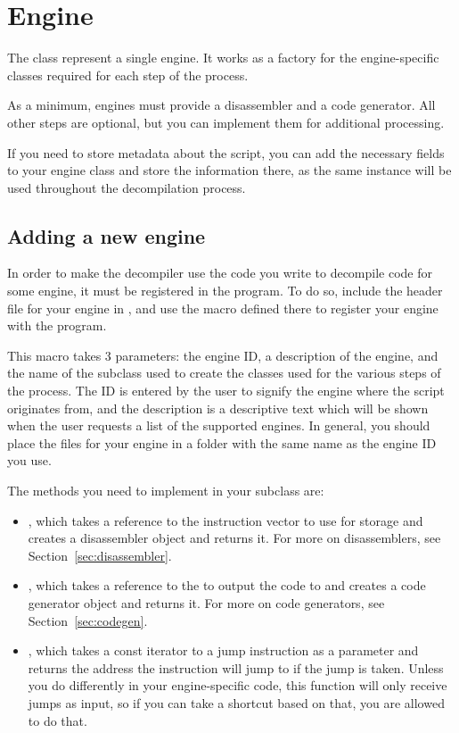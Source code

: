 \section{Engine}
The  class represent a single engine. It works as a factory for the engine-specific classes required for each step of the process.

As a minimum, engines must provide a disassembler and a code generator. All other steps are optional, but you can implement them for additional processing.

If you need to store metadata about the script, you can add the necessary fields to your engine class and store the information there, as the same instance will be used throughout the decompilation process.

\subsection{Adding a new engine}
In order to make the decompiler use the code you write to decompile code for some engine, it must be registered in the program. To do so, include the header file for your engine in , and use the  macro defined there to register your engine with the program.

This macro takes 3 parameters: the engine ID, a description of the engine, and the name of the  subclass used to create the classes used for the various steps of the process. The ID is entered by the user to signify the engine where the script originates from, and the description is a descriptive text which will be shown when the user requests a list of the supported engines. In general, you should place the files for your engine in a folder with the same name as the engine ID you use.

The methods you need to implement in your  subclass are:
\begin{itemize}
\item {}, which takes a reference to the instruction vector to use for storage and creates a disassembler object and returns it. For more on disassemblers, see Section~\vref{sec:disassembler}.
\item {}, which takes a reference to the  to output the code to and creates a code generator object and returns it. For more on code generators, see Section~\vref{sec:codegen}.
\item {}, which takes a const iterator to a jump instruction as a parameter and returns the address the instruction will jump to if the jump is taken. Unless you do differently in your engine-specific code, this function will only receive jumps as input, so if you can take a shortcut based on that, you are allowed to do that.
\end{itemize}

